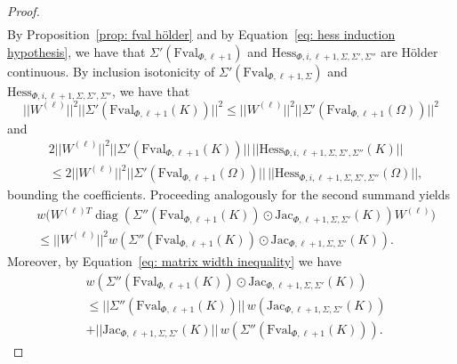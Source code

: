 \documentclass[a4paper, 11pt]{article}
\begin{document}
\begin{proof}
\begin{equation*}
\begin{aligned}
			\end{aligned}
		\end{equation*}
		By Proposition~\ref{prop: fval hölder} and by Equation~\eqref{eq: hess induction hypothesis}, we have that $\Sigma'(\mathrm{Fval}_{\Phi,\ell+1})$ and $\mathrm{Hess}_{\Phi, i,{\ell}+1, \Sigma, \Sigma', \Sigma''}$ are Hölder continuous. By inclusion isotonicity of $\Sigma'(\mathrm{Fval}_{\Phi, \ell+1, \Sigma})$ and $\mathrm{Hess}_{\Phi, i,{\ell}+1, \Sigma, \Sigma', \Sigma''}$, we have that
		$$ ||W^{({\ell})}||^2 ||\Sigma'(\mathrm{Fval}_{\Phi, {\ell}+1}({K}))||^2  \leq ||W^{({\ell})}||^2 ||\Sigma'(\mathrm{Fval}_{\Phi, {\ell}+1}({\Omega}))||^2$$
		and 
		\begin{equation*}
			\begin{aligned}
				&2 ||W^{({\ell})}||^2 ||\Sigma'(\mathrm{Fval}_{\Phi, {\ell}+1}({K}))|| \,||\mathrm{Hess}_{\Phi, i,{\ell}+1, \Sigma, \Sigma', \Sigma''}({K}) || \\
				&\leq 2 ||W^{({\ell})}||^2 ||\Sigma'(\mathrm{Fval}_{\Phi, {\ell}+1}({\Omega}))|| \,||\mathrm{Hess}_{\Phi, i,{\ell}+1, \Sigma, \Sigma', \Sigma''}({\Omega}) ||,
			\end{aligned}
		\end{equation*}
		bounding the coefficients. Proceeding analogously for the second summand yields
		\begin{equation*}
			\begin{aligned}
				& w\bigg(W^{({\ell})T} \operatorname{diag}\left(\Sigma'' (\mathrm{Fval}_{\Phi, {\ell}+1}({K})) \odot \mathrm{Jac}_{\Phi, {\ell}+1, \Sigma, \Sigma'}({K})\right)  W^{({\ell})}\bigg) \\
				&\leq ||W^{(\ell)}||^2 w\left(\Sigma'' (\mathrm{Fval}_{\Phi, {\ell}+1}({K})) \odot \mathrm{Jac}_{\Phi, {\ell}+1, \Sigma, \Sigma'}({K})\right).
			\end{aligned}
		\end{equation*}
		Moreover, by Equation~\eqref{eq: matrix width inequality} we have
		\begin{equation*}
			\begin{aligned}
				&w\left(\Sigma'' (\mathrm{Fval}_{\Phi, {\ell}+1}({K})) \odot \mathrm{Jac}_{\Phi, {\ell}+1, \Sigma, \Sigma'}({K})\right) \\
				&\leq || \Sigma'' (\mathrm{Fval}_{\Phi, {\ell}+1}({K}))||\, w(\mathrm{Jac}_{\Phi, {\ell}+1, \Sigma, \Sigma'}({K})) \\
				& +|| \mathrm{Jac}_{\Phi, {\ell}+1, \Sigma, \Sigma'}({K})||\, w(\Sigma'' (\mathrm{Fval}_{\Phi, {\ell}+1}({K}))).
			\end{aligned}

\end{equation*}
\end{proof}
\end{document}

